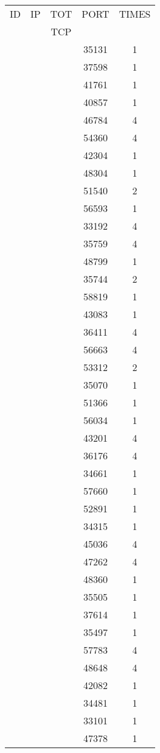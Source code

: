 \documentclass[a4paper]{scrartcl}
\begin{document}
\begin{minipage}[b]{0.5\linewidth}
\begin{tabular}{| c | c | c | c | c |}
\hline
ID & IP & TOT & PORT & TIMES \\ 
   &    & TCP &      &       \\ 
\hline
& & & 35131 & 1 \\ & & & 37598 & 1 \\ & & & 41761 & 1 \\ & & & 40857 & 1 \\ & & & 46784 & 4 \\ & & & 54360 & 4 \\ & & & 42304 & 1 \\ & & & 48304 & 1 \\ & & & 51540 & 2 \\ & & & 56593 & 1 \\ & & & 33192 & 4 \\ & & & 35759 & 4 \\ & & & 48799 & 1 \\ & & & 35744 & 2 \\ & & & 58819 & 1 \\ & & & 43083 & 1 \\ & & & 36411 & 4 \\ & & & 56663 & 4 \\ & & & 53312 & 2 \\ & & & 35070 & 1 \\ & & & 51366 & 1 \\ & & & 56034 & 1 \\ & & & 43201 & 4 \\ & & & 36176 & 4 \\ & & & 34661 & 1 \\ & & & 57660 & 1 \\ & & & 52891 & 1 \\ & & & 34315 & 1 \\ & & & 45036 & 4 \\ & & & 47262 & 4 \\ & & & 48360 & 1 \\ & & & 35505 & 1 \\ & & & 37614 & 1 \\ & & & 35497 & 1 \\ & & & 57783 & 4 \\ & & & 48648 & 4 \\ & & & 42082 & 1 \\ & & & 34481 & 1 \\ & & & 33101 & 1 \\ & & & 47378 & 1 \\ \hline\end{tabular}\end{minipage} \hfill\begin{minipage}[b]{0.5\linewidth}\begin{tabular}{| c | c | c | c | c |}

\end{tabular}
\end{minipage}
\end{document}
